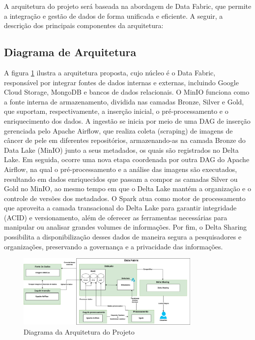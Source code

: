 A arquitetura do projeto será baseada na abordagem de Data Fabric, que permite a integração e gestão de dados de forma unificada e eficiente. A seguir, a descrição dos principais componentes da arquitetura:

\subsection{Diagrama de Arquitetura}
A figura \ref{fig:arquitetura_projeto} ilustra a arquitetura proposta, cujo núcleo é o Data Fabric, responsável por integrar fontes de dados internas e externas, incluindo Google Cloud Storage, MongoDB e bancos de dados relacionais. O MinIO funciona como a fonte interna de armazenamento, dividida nas camadas Bronze, Silver e Gold, que suportam, respectivamente, a inserção inicial, o pré-processamento e o enriquecimento dos dados. A ingestão se inicia por meio de uma DAG de inserção gerenciada pelo Apache Airflow, que realiza coleta (scraping) de imagens de câncer de pele em diferentes repositórios, armazenando-as na camada Bronze do Data Lake (MinIO) junto a seus metadados, os quais são registrados no Delta Lake. Em seguida, ocorre uma nova etapa coordenada por outra DAG do Apache Airflow, na qual o pré-processamento e a análise das imagens são executados, resultando em dados enriquecidos que passam a compor as camadas Silver ou Gold no MinIO, ao mesmo tempo em que o Delta Lake mantém a organização e o controle de versões dos metadados. O Spark atua como motor de processamento que aproveita a camada transacional do Delta Lake para garantir integridade (ACID) e versionamento, além de oferecer as ferramentas necessárias para manipular ou analisar grandes volumes de informações. Por fim, o Delta Sharing possibilita a disponibilização desses dados de maneira segura a pesquisadores e organizações, preservando a governança e a privacidade das informações.

\begin{figure}[h]
    \centering
    \includegraphics[width=0.8\textwidth]{figuras/arquitetura.eps}
    \caption{Diagrama da Arquitetura do Projeto }
    \label{fig:arquitetura_projeto}
\end{figure} 


